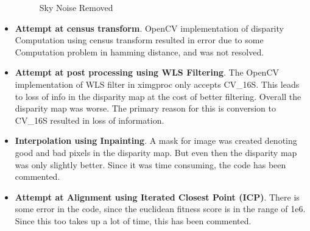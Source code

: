 \documentclass{article}
\begin{document}
\begin{itemize}
  \begin{figure}[H]
    \centering
    \caption{Sky Noise Removed}
  \end{figure}
\item \textbf{Attempt at census transform}. OpenCV implementation of disparity Computation using census transform resulted in error due to some Computation problem in hamming distance, and was not resolved.
\item \textbf{Attempt at post processing using WLS Filtering}. The OpenCV implementation of WLS filter in ximgproc only accepts CV\_16S. This leads to loss of info in the disparity map at the cost of better filtering. Overall the disparity map was worse. The primary reason for this is conversion to CV\_16S resulted in loss of information.
\item \textbf{Interpolation using Inpainting}. A mask for image was created denoting good and bad pixels in the disparity map. But even then the disparity map was only slightly better. Since it was time consuming, the code has been commented.
\item \textbf{Attempt at Alignment using Iterated Closest Point (ICP)}. There is some error in the code, since the euclidean fitness score is in the range of 1e6. Since this too takes up a lot of time, this has been commented. 
\end{itemize}
\end{document}
